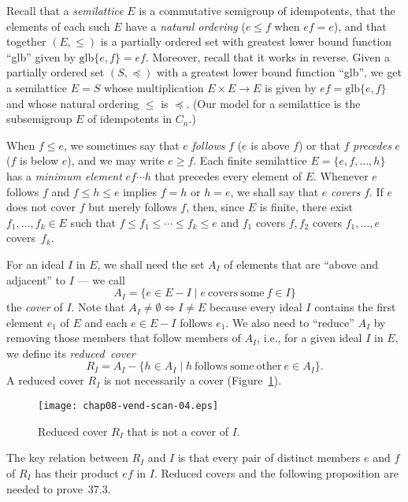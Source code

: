 \documentclass{surv-l}
\numberwithin{equation}{section}
\numberwithin{table}{section}
\numberwithin{figure}{section}
\theoremstyle{plain}
\theoremstyle{definition}
\begin{document}
Recall that a \emph{semilattice} $E$ is a commutative semigroup of
idempotents, that the elements of each such $E$ have a
\emph{natural ordering} ($e\leq f$ when $ef =e$), and that
together $(E, \leq)$ is a partially ordered set with greatest
lower bound function ``glb'' given by $\mathrm{glb}\{e, f\}=ef$.
Moreover, recall that it works in reverse. Given a partially
ordered set $(S, \preceq)$ with a greatest lower bound function
``glb'', we get a semilattice $E=S$ whose multiplication $E\times
E\rightarrow E$ is given by $ef=\mathrm{glb}\{e, f\}$ and whose
natural ordering $\leq$ is $\preceq$. (Our model for a semilattice
is the subsemigroup $E$ of idempotents in $C_{n}.$)

When $f\leq e$, we sometimes say that $e$ \emph{follows} $f$ ($e$
is above $f$) or that $f$ \emph{precedes} $e$ ($f$ is below $e$),
and we may write $e\geq f$. Each finite semilattice $E=\{e,
f,\ldots, h\}$ has a \emph{minimum element} $ef\cdots h$ that
precedes every element of $E$. Whenever $e$ follows $f$ and $f\leq
h\leq e$ implies $f=h$ or $h=e$, we shall say that $e$
\emph{covers} $f$. If $e$ does not cover $f$ but merely follows
$f$, then, since $E$ is finite, there exist $f_{1},\ldots,f_{k}\in
E$ such that $f\leq f_{1}\leq\cdots\leq f_{k}\leq e$ and $f_{1}$
covers $f, f_{2}$ covers $f_{1},\ldots, e$ covers~$f_{k}$.

For an ideal $I$ in $E$, we shall need the set $A_{I}$ of elements
that are ``above and adjacent'' to $I$ --- we call
\[
A_{I}=\{e\in E-I \mid e\ \mathrm{covers\ some}\ f\in I \}
\]
the \emph{cover} of $I$. Note that
$A_{I}\neq\emptyset\Leftrightarrow I \neq E$ because every ideal
$I$ contains the first element $e_{1}$ of $E$ and each $ e\in E-I$
follows $e_{1}$. We also need to ``reduce'' $A_{I}$ by removing
those members that follow members of $A_{I}$, i.e., for a given
ideal $I$ in $E$, we define its \emph{reduced~cover}
\[
R_{I}=A_{I}-\{h\in A_{I}\mid h\ \mathrm{follows\ some\ other}\ e\in A_{I}\}.
\]
A reduced cover $R_{I}$ is not necessarily a cover
(Figure~\ref{fig8.37.1}).

\begin{figure}[!h]
\texttt{[image: chap08-vend-scan-04.eps]}
\caption{Reduced cover $R_{I}$ that is not a cover of $I$.}\label{fig8.37.1}
\end{figure}

The key relation between $R_{I}$ and $I$ is that every pair of
distinct members $e$ and $f$ of $R_{I}$ has their product $ef$ in
$I$. Reduced covers and the following proposition are needed to
prove~37.3.
\end{document}
